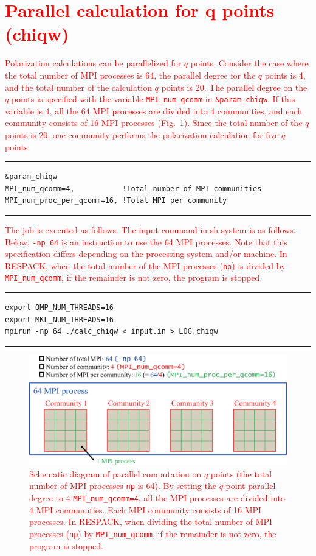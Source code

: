 \documentclass{article}
\newcommand{\tr}[1]{\textcolor{red}{#1}}
\begin{document}
\clearpage 

\section{\label{qcom}\tr{Parallel calculation for q points (chiqw)}}
\tr{Polarization calculations can be parallelized for $q$ points. Consider the case where the total number of MPI processes is 64, the parallel degree for the $q$ points is 4, and the total number of the calculation $q$ points is 20. The parallel degree on the $q$ points is specified with the variable {\tt MPI\_num\_qcomm} in {\tt \&param\_chiqw}. If this variable is 4, all the 64 MPI processes are divided into 4 communities, and each community consists of 16 MPI processes (Fig.~\ref{qcommunity}). Since the total number of the $q$ points is 20, one community performs the polarization calculation for five $q$ points.} 
\vspace{3mm}\hrule
\begin{verbatim}
&param_chiqw 
MPI_num_qcomm=4,           !Total number of MPI communities
MPI_num_proc_per_qcomm=16, !Total MPI per community 
\end{verbatim}
\hrule\vspace{3mm}
\tr{The job is executed as follows. The input command in sh system is as follows. Below, {\tt -np 64} is an instruction to use the 64 MPI processes. Note that this specification differs depending on the processing system and/or machine. In RESPACK, when the total number of the MPI processes ({\tt np}) is divided by {\tt MPI\_num\_qcomm}, if the remainder is not zero, the program is stopped.}  
\vspace{3mm}\hrule
\begin{verbatim}
export OMP_NUM_THREADS=16
export MKL_NUM_THREADS=16
mpirun -np 64 ./calc_chiqw < input.in > LOG.chiqw  
\end{verbatim}
\hrule\vspace{3mm}
\begin{figure}[H] 
\centering
\includegraphics[width=14cm]{q-community.eps}
\caption{\tr{Schematic diagram of parallel computation on $q$ points (the total number of MPI processes {\tt np} is 64). By setting the $q$-point parallel degree to 4 {\tt MPI\_num\_qcomm=4}, all the MPI processes are divided into 4 MPI communities. Each MPI community consists of 16 MPI processes. In RESPACK, when dividing the total number of MPI processes ({\tt np}) by {\tt MPI\_num\_qcomm}, if the remainder is not zero, the program is stopped.}}
\label{qcommunity}
\end{figure}
\end{document}
